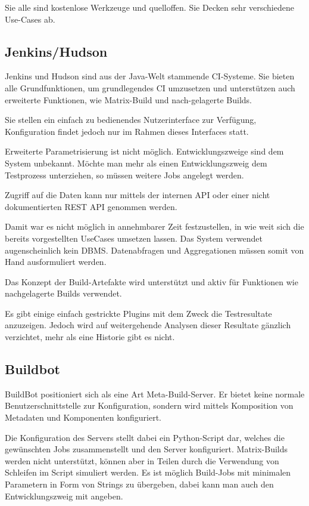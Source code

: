 Sie alle sind kostenlose Werkzeuge und quelloffen.
Sie Decken sehr verschiedene Use-Cases ab.

\subsection{Jenkins/Hudson}

Jenkins und Hudson sind aus der Java-Welt  stammende \ac{CI}-Systeme.
Sie bieten alle Grundfunktionen, um grundlegendes \ac{CI} umzusetzen
und unterst\"utzen auch erweiterte Funktionen,
wie Matrix-Build und nach-gelagerte Builds.

Sie stellen ein einfach zu bedienendes Nutzerinterface zur Verfügung,
Konfiguration findet jedoch nur im Rahmen dieses Interfaces statt.

Erweiterte Parametrisierung ist nicht m\"oglich.
Entwicklungszweige sind dem System unbekannt.
M\"ochte man mehr als einen Entwicklungszweig dem Testprozess unterziehen,
so m\"ussen weitere Jobs angelegt werden.

Zugriff auf die Daten kann nur mittels der internen \ac{API} oder
einer nicht dokumentierten \ac{REST} \ac{API} genommen werden.

Damit war es nicht m\"oglich in annehmbarer Zeit festzustellen,
in wie weit sich die bereits vorgestellten UseCases umsetzen lassen.
Das System verwendet augenscheinlich kein \ac{DBMS}.
Datenabfragen und Aggregationen m\"ussen
somit von Hand ausformuliert werden.

Das Konzept der Build-Artefakte wird unterst\"utzt und
aktiv f\"ur Funktionen wie nachgelagerte Builds verwendet.

Es gibt einige einfach gestrickte Plugins mit dem Zweck die Testresultate anzuzeigen.
Jedoch wird auf weitergehende Analysen dieser Resultate g\"anzlich verzichtet,
mehr als eine Historie gibt es nicht.


\subsection{Buildbot}


BuildBot \cite{buildbot:website} positioniert sich als eine Art Meta-Build-Server.
Er bietet keine normale Benutzerschnittstelle zur Konfiguration,
sondern wird mittels Komposition von Metadaten und Komponenten konfiguriert.

Die Konfiguration des Servers stellt dabei ein Python-Script dar,
welches die gewünschten Jobs zusammenstellt und den Server konfiguriert.
Matrix-Builds werden nicht unterst\"utzt,
k\"onnen aber in Teilen durch die Verwendung von Schleifen im Script simuliert werden.
Es ist möglich Build-Jobs mit minimalen Parametern in Form von Strings zu \"ubergeben,
dabei kann man auch den Entwicklungszweig mit angeben.

